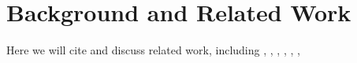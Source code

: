 \section{Background and Related Work}
\label{sxn:background}

Here we will cite and discuss related work, including
\cite{MM17_TR},
\cite{MM18_TR},
\cite{MM19_HTSR_ICML},
\cite{weightwatcher_package}
\cite{MM19_KDD},
\cite{MM20_SDM},
\cite{MM20_unpub_work},

